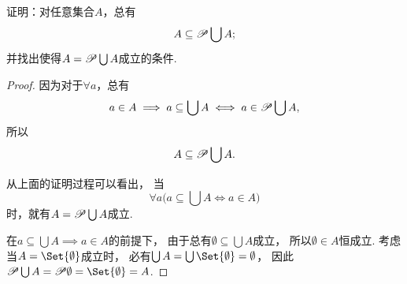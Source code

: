 \begin{example}
证明：对任意集合\(A\)，总有
\begin{equation}\label{equation:集合论.系的并的幂集包含系}
	A \subseteq \mathscr{P} \bigcup A;
\end{equation}
并找出使得\(A = \mathscr{P} \bigcup A\)成立的条件.
\begin{proof}
因为对于\(\forall a\)，总有\[
	a \in A
	\implies
	a \subseteq \bigcup A
	\iff
	a \in \mathscr{P} \bigcup A,
\]
所以\[
	A \subseteq \mathscr{P} \bigcup A.
\]

从上面的证明过程可以看出，
当\[
	\forall a \bigl( a \subseteq \bigcup A \iff a \in A \bigr)
\]时，就有\(A = \mathscr{P} \bigcup A\)成立.

在\(a \subseteq \bigcup A \implies a \in A\)的前提下，
由于总有\(\emptyset \subseteq \bigcup A\)成立，
所以\(\emptyset \in A\)恒成立.
考虑当\(A = \Set{\emptyset}\)成立时，
必有\(\bigcup A = \bigcup\Set{\emptyset} = \emptyset\)，
因此\(\Powerset \bigcup A = \Powerset \emptyset = \Set{\emptyset} = A\).
\end{proof}
\end{example}
